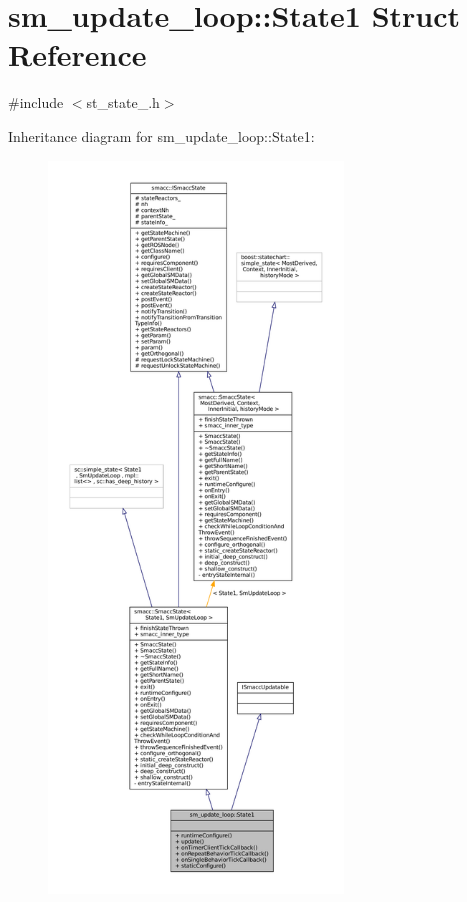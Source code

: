 \hypertarget{structsm__update__loop_1_1State1}{}\section{sm\+\_\+update\+\_\+loop\+:\+:State1 Struct Reference}
\label{structsm__update__loop_1_1State1}


{\ttfamily \#include $<$st\+\_\+state\+\_.\+h$>$}



Inheritance diagram for sm\+\_\+update\+\_\+loop\+:\+:State1\+:
\nopagebreak
\begin{figure}[H]
\begin{center}
\leavevmode
\includegraphics[height=550pt]{structsm__update__loop_1_1State1__inherit__graph}
\end{center}
\end{figure}


